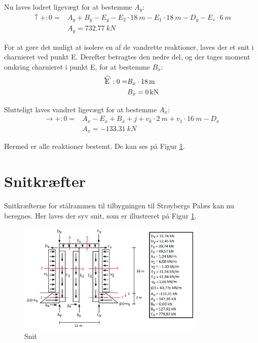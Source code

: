 Nu laves lodret ligevægt for at bestemme $A_y$:
\begin{equation}
\begin{split}
	\uparrow+: 0 = & A_y + B_y - E_y - E_2 \cdot \SI{18}{m} - E_1 \cdot \SI{18}{m} - D_y - E_s \cdot \SI{6}{m}
	\\ &
	A_y = \SI{732,77}{kN}
\end{split}
\end{equation}

For at gøre det muligt at isolere en af de vandrette reaktioner, laves der et snit i charnieret ved punkt E. Derefter betragtes den nedre del, og der tages moment omkring charnieret i punkt E, for at bestemme $B_x$:
\begin{equation}
\begin{split}
	\ALN{\text{E}}: 0 = & B_x \cdot \SI{18}{m}
	\\ &
	B_x = \SI{0}{kN}
\end{split}
\end{equation}

Slutteligt laves vandret ligevægt for at bestemme $A_x$:
\begin{equation}
\begin{split}
	\rightarrow+: 0 = & A_x - E_x + B_x + j + v_k \cdot \SI{2}{m} + v_1 \cdot \SI{16}{m} - D_x
	\\ &
	A_x = \SI{-133,31}{kN}
\end{split}
\end{equation} 

Hermed er alle reaktioner bestemt. De kan ses på Figur \ref{fig:snitbrud}.

\section{Snitkræfter}
Snitkræfterne for stålrammen til tilbygningen til Strøybergs Palæs kan nu beregnes. Her laves der syv snit, som er illustreret på Figur \ref{fig:snitbrud}.

\begin{figure}[H]
	\centering
	\includegraphics[width=0.8\textwidth]{billeder/snitbrud.png}
	\caption{Snit}
	\label{fig:snitbrud}
\end{figure}

